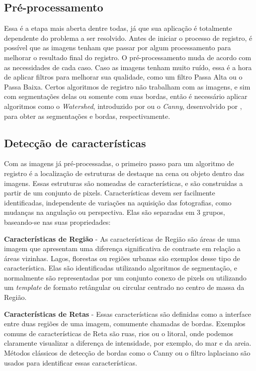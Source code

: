 \subsection{Pré-processamento}
    Essa é a etapa mais aberta dentre todas, já que sua aplicação é totalmente dependente do problema a ser resolvido. 
Antes de iniciar o processo de registro, é possível que as imagens tenham que passar por algum processamento para 
melhorar o resultado final do registro. O pré-processamento muda de acordo com as necessidades de cada caso. Caso as
imagens tenham muito ruído, essa é a hora de aplicar filtros para melhorar sua qualidade, como um filtro Passa Alta ou 
o Passa Baixa. Certos algoritmos de registro não trabalham com as imagens, e sim com segmentações delas ou somente com 
suas bordas, então é necessário aplicar algoritmos como o \textit{Watershed}, introduzido por 
\cite{vincent1991watersheds} ou o \textit{Canny}, desenvolvido por \cite{canny1986computational}, para obter as 
segmentações e bordas, respectivamente.

\subsection{Detecção de características}
\label{sec:dec_corr_carac}

    Com as imagens já pré-processadas, o primeiro passo para um algoritmo de registro é a localização de estruturas de 
destaque na cena ou objeto dentro das imagens. Essas estruturas são nomeadas de características, e são construidas a 
partir de um conjunto de pixels. Características devem ser facilmente identificadas, independente de variações na 
aquisição das fotografias, como mudanças na angulação ou perspectiva. Elas são separadas em 3 grupos, baseando-se nas 
suas propriedades:

\textbf{Características de Região} - As características de Região são áreas de uma imagem que apresentam uma diferença
significativa de contraste em relação a áreas vizinhas. Lagos, florestas ou regiões urbanas são exemplos desse tipo de 
característica. Elas são identificadas utilizando algoritmos de segmentação, e normalmente são representadas por um
conjunto conexo de pixels ou utilizando um \textit{template} de formato retângular ou circular centrado no centro de 
massa da Região.

\textbf{Características de Retas} - Essas características são definidas como a interface entre duas regiões de uma 
imagem, comumente chamadas de bordas. Exemplos comuns de características de Reta são ruas, rios ou o litoral, onde 
podemos claramente visualizar a diferença de intensidade, por exemplo, do mar e da areia. Métodos clássicos de detecção 
de bordas como o Canny ou o filtro laplaciano são usados para identificar essas características.

